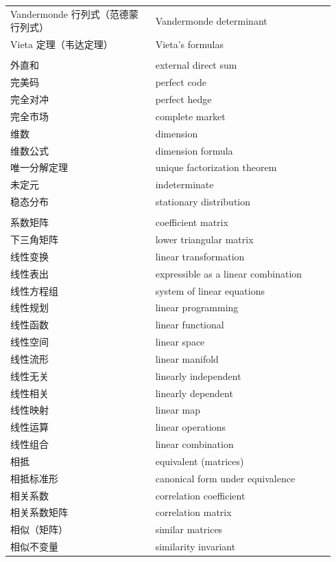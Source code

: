 {\begin{longtable}{p{0.42\linewidth}p{0.52\linewidth}}
		Vandermonde 行列式（范德蒙行列式） & Vandermonde determinant \\
		Vieta 定理（韦达定理） & Vieta's formulas \\
		\addlinespace
		\multicolumn{2}{l}{\textbf{\sffamily W}} \\
		外直和 & external direct sum \\
		完美码 & perfect code \\
		完全对冲 & perfect hedge \\
		完全市场 & complete market \\
		维数 & dimension \\
		维数公式 & dimension formula \\
		唯一分解定理 & unique factorization theorem \\
		未定元 & indeterminate \\
		稳态分布 & stationary distribution \\
		\addlinespace
		\multicolumn{2}{l}{\textbf{\sffamily X}} \\
		系数矩阵 & coefficient matrix \\
		下三角矩阵 & lower triangular matrix \\
		线性变换 & linear transformation \\
		线性表出 & expressible as a linear combination \\
		线性方程组 & system of linear equations \\
		线性规划 & linear programming \\
		线性函数 & linear functional \\
		线性空间 & linear space \\
		线性流形 & linear manifold \\
		线性无关 & linearly independent \\
		线性相关 & linearly dependent \\
		线性映射 & linear map \\
		线性运算 & linear operations \\
		线性组合 & linear combination \\
		相抵 & equivalent (matrices) \\
		相抵标准形 & canonical form under equivalence \\
		相关系数 & correlation coefficient \\
		相关系数矩阵 & correlation matrix \\
		相似（矩阵） & similar matrices \\
		相似不变量 & similarity invariant \\

\end{longtable}}
